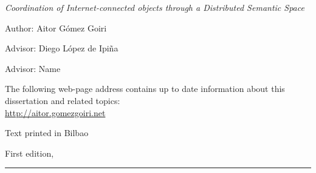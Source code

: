 
\thispagestyle{empty}

\hfill

\vfill

\medskip


\noindent
\textit{
Coordination of Internet-connected objects through a Distributed Semantic Space
}




Author: Aitor Gómez Goiri

Advisor: Diego López de Ipiña

Advisor: Name



\vfill

\vfill

\noindent
The following web-page address contains up to date information about this dissertation and related topics: \\
\url{http://aitor.gomezgoiri.net}


\noindent
Text printed in Bilbao

\noindent
First edition, 
\monthname \ \the\year

\vspace{1cm}
\hrule
\bigskip

\cleardoublepage

%
%
%
%
%
%

